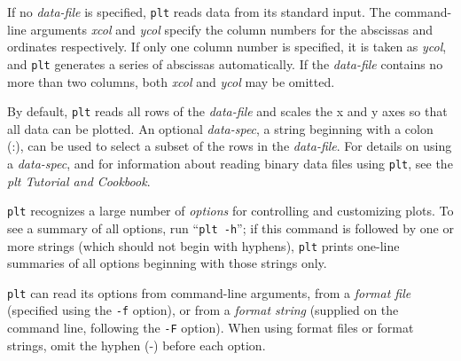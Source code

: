 If no \textit{data-file} is specified, \texttt{plt} reads data from its standard input.  The
command-line arguments \textit{xcol} and \textit{ycol} specify the column numbers for the
abscissas and ordinates respectively.  If only one column number is specified,
it is taken as \textit{ycol}, and \texttt{plt} generates a series of abscissas automatically.
 If the \textit{data-file} contains no more than two columns, both \textit{xcol} and \textit{ycol}
may be omitted. 

By default, \texttt{plt} reads all rows of the \textit{data-file} and scales
the x and y axes so that all data can be plotted.  An optional \textit{data-spec},
a string beginning with a colon (:), can be used to select a subset of
the rows in the \textit{data-file}.  For details on using a \textit{data-spec}, and for information
about reading binary data files using \texttt{plt}, see the \textit{plt Tutorial and Cookbook}.


\texttt{plt} recognizes a large number of \textit{options} for controlling and customizing
plots.  To see a summary of all options, run ``\texttt{plt -h}''; if this command is followed
by one or more strings (which should not begin with hyphens), \texttt{plt} prints
one-line summaries of all options beginning with those strings only. 

\texttt{plt}
can read its options from command-line arguments, from a \textit{format file} (specified
using the \texttt{-f} option), or from a \textit{format string} (supplied on the command line,
following the \texttt{-F} option).   When using format files or format strings, omit
the hyphen (-) before each option. 
